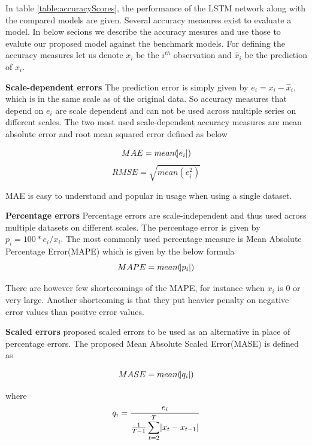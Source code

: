 In table \ref{table:accuracyScores}, the performance of the LSTM network along with the compared
models are given. Several accuracy measures exist to evaluate a model. In below secions we describe
the accuracy mesures and use those to evalute our proposed model against the benchmark models.
For defining the accuracy measures let us denote $x_{i}$ be the $i^{th}$ observation and
$\hat{x}_{i}$ be the prediction of $x_{i}$.

\textbf{Scale-dependent errors}
The prediction error is simply given by $e_{i} = x_{i} - \hat{x}_{i}$, which is in the same scale
as of the original data. So accuracy measures that depend on $e_{i}$ are scale dependent and can
not be used across multiple series on different scales. The two most used scale-dependent
accuracy measures are mean absolute error and root mean squared error defined as below

    \begin{equation}
        MAE = mean(\abs{e_{i}})
    \end{equation}
    \begin{equation}
        RMSE = \sqrt{mean(e^{2}_{i})}
    \end{equation}

MAE is easy to understand and popular in usage when using a single dataset.

\textbf{Percentage errors}
Percentage errors are scale-independent and thus used across multiple datasets on different
scales. The percentage error is given by $p_{i} = 100*e_{i}/x_{i}$. The most commonly used
percentage measure is Mean Absolute Percentage Error(MAPE) which is given by the below formula
    \begin{equation}
        MAPE = mean(\abs{p_{i}})
    \end{equation}

There are however few shortccomings of the MAPE, for instance when $x_{i}$ is 0 or very large.
Another shortcoming is that they put heavier penalty on negative error values than positve error
values.

\textbf{Scaled errors}
\citet{hyndman2006another} proposed scaled errors to be used as an alternative in place of
percentage errors. The proposed Mean Absolute Scaled Error(MASE) is defined as

    \begin{equation}
        MASE = mean(\abs{q_{i}})
    \end{equation}

where
    \begin{equation}
        q_{i} = \frac{e_{i}}{\frac{1}{T-1} \displaystyle\sum_{t=2}^{T}\abs{x_{t} - x_{t-1}}}
    \end{equation}

